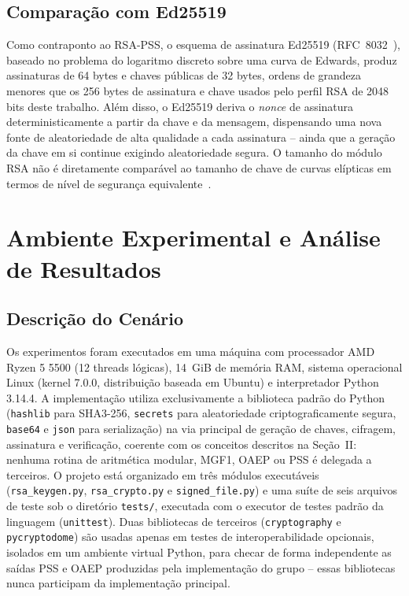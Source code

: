 \documentclass[conference]{IEEEtran}
\begin{document}
\subsection{Comparação com Ed25519}

Como contraponto ao RSA-PSS, o esquema de assinatura Ed25519 (RFC~8032~\cite{rfc8032}), baseado
no problema do logaritmo discreto sobre uma curva de Edwards, produz assinaturas de 64 bytes e
chaves públicas de 32 bytes, ordens de grandeza menores que os 256 bytes de assinatura e chave
usados pelo perfil RSA de 2048 bits deste trabalho. Além disso, o Ed25519 deriva o
\textit{nonce} de assinatura deterministicamente a partir da chave e da mensagem, dispensando
uma nova fonte de aleatoriedade de alta qualidade a cada assinatura -- ainda que a geração da
chave em si continue exigindo aleatoriedade segura. O tamanho do módulo RSA não é diretamente
comparável ao tamanho de chave de curvas elípticas em termos de nível de segurança
equivalente~\cite{ferguson2010cryptography}.

\section{Ambiente Experimental e Análise de Resultados}

\subsection{Descrição do Cenário}

Os experimentos foram executados em uma máquina com processador AMD Ryzen 5 5500 (12 threads
lógicas), 14~GiB de memória RAM, sistema operacional Linux (kernel 7.0.0, distribuição baseada
em Ubuntu) e interpretador Python 3.14.4. A implementação utiliza exclusivamente a biblioteca
padrão do Python (\texttt{hashlib} para SHA3-256, \texttt{secrets} para aleatoriedade
criptograficamente segura, \texttt{base64} e \texttt{json} para serialização) na via principal
de geração de chaves, cifragem, assinatura e verificação, coerente com os conceitos descritos
na Seção~II: nenhuma rotina de aritmética modular, MGF1, OAEP ou PSS é delegada a terceiros. O
projeto está organizado em três módulos executáveis (\texttt{rsa\_keygen.py},
\texttt{rsa\_crypto.py} e \texttt{signed\_file.py}) e uma suíte de seis arquivos de teste sob o
diretório \texttt{tests/}, executada com o executor de testes padrão da linguagem
(\texttt{unittest}). Duas bibliotecas de terceiros (\texttt{cryptography} e
\texttt{pycryptodome}) são usadas apenas em testes de interoperabilidade opcionais, isolados em
um ambiente virtual Python, para checar de forma independente as saídas PSS e OAEP produzidas
pela implementação do grupo -- essas bibliotecas nunca participam da implementação principal.
\end{document}
